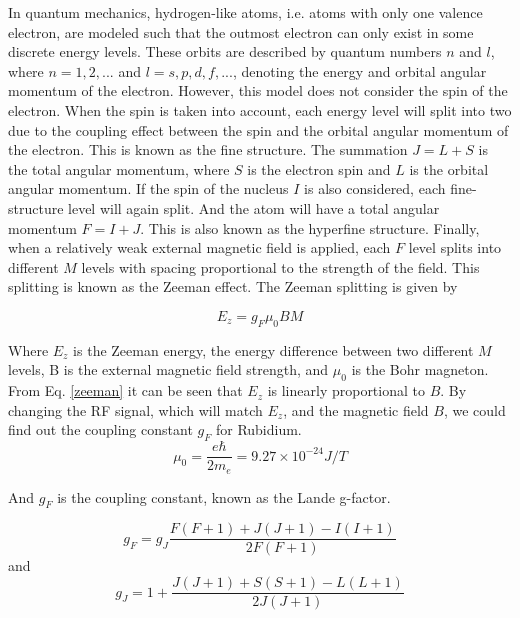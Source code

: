 \documentclass[prb,preprint]{revtex4-1}
\begin{document}
In quantum mechanics, hydrogen-like atoms, i.e. atoms with only one valence electron, are modeled such that the outmost electron can only exist in some discrete energy levels. These orbits are described by quantum numbers $n$ and $l$, where $n=1, 2, ...$ and $l=s, p, d, f, ...$, denoting the energy and orbital angular momentum of the electron. However, this model does not consider the spin of the electron. When the spin is taken into account, each energy level will split into two due to the coupling effect between the spin and the orbital angular momentum of the electron. This is known as the fine structure. The summation $J=L+S$ is the total angular momentum, where $S$ is the electron spin and $L$ is the orbital angular momentum. If the spin of the nucleus $I$ is also considered, each fine-structure level will again split. And the atom will have a total angular momentum $F=I+J$. This is also known as the hyperfine structure. Finally, when a relatively weak external magnetic field is applied, each $F$ level splits into different $M$ levels with spacing proportional to the strength of the field. This splitting is known as the Zeeman effect. The Zeeman splitting is given by

\begin{equation}
E_{z}=g_{F} \mu_{0} BM
\label{zeeman}
\end{equation}

Where $E_{z}$ is the Zeeman energy, the energy difference between two different $M$ levels, B is the external magnetic field strength, and $\mu_{0}$ is the Bohr magneton. From Eq. \eqref{zeeman} it can be seen that $E_{z}$ is linearly proportional to $B$. By changing the RF signal, which will match $E_{z}$, and the magnetic field $B$, we could find out the coupling constant $g_{F}$ for Rubidium.\\

\begin{equation}
\mu_{0}=\frac{e\hbar}{2m_{e}}=9.27\times10^{-24} J/T
\label{mu0}
\end{equation}

And $g_{F}$ is the coupling constant, known as the Lande g-factor. 

\begin{equation}
g_{F}=g_{J} \frac{F(F+1)+J(J+1)-I(I+1)}{2F(F+1)}
\label{gf}
\end{equation}
and
\begin{equation}
g_{J}=1+\frac{J(J+1)+S(S+1)-L(L+1)}{2J(J+1)}
\label{gj}
\end{equation}
\end{document}
